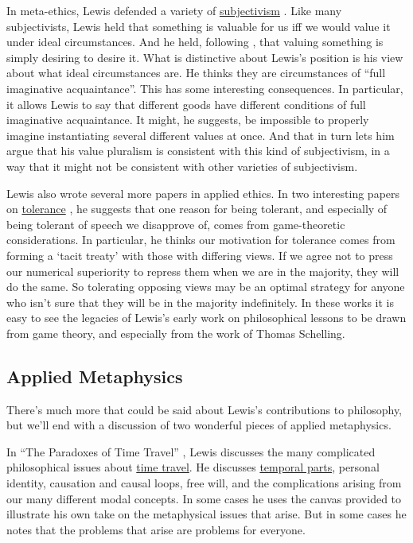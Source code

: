 In meta-ethics, Lewis defended a variety of \href{http://plato.stanford.edu/moral-anti-realism/index.html#Sub}{subjectivism} \citeyearpar{Lewis1989b}. Like many subjectivists, Lewis held that something is valuable for us iff we would value it under ideal circumstances. And he held, following \citet{Frankfurt1971}, that valuing something is simply desiring to desire it. What is distinctive about Lewis's position is his view about what ideal circumstances are. He thinks they are circumstances of ``full imaginative acquaintance''. This has some interesting consequences. In particular, it allows Lewis to say that different goods have different conditions of full imaginative acquaintance. It might, he suggests, be impossible to properly imagine instantiating several different values at once. And that in turn lets him argue that his value pluralism is consistent with this kind of subjectivism, in a way that it might not be consistent with other varieties of subjectivism.

Lewis also wrote several more papers in applied ethics. In two interesting papers on \href{http://plato.stanford.edu/toleration/}{tolerance} \citeyearpar{Lewis1989a, Lewis1989d}, he suggests that one reason for being tolerant, and especially of being tolerant of speech we disapprove of, comes from game-theoretic considerations. In particular, he thinks our motivation for tolerance comes from forming a `tacit treaty' with those with differing views. If we agree not to press our numerical superiority to repress them when we are in the majority, they will do the same. So tolerating opposing views may be an optimal strategy for anyone who isn't sure that they will be in the majority indefinitely. In these works it is easy to see the legacies of Lewis's early work on philosophical lessons to be drawn from game theory, and especially from the work of Thomas Schelling.

\subsection{Applied Metaphysics} 
There's much more that could be said about Lewis's contributions to philosophy, but we'll end with a discussion of two wonderful pieces of applied metaphysics.

In ``The Paradoxes of Time Travel'' \citeyearpar{Lewis1976d}, Lewis discusses the many complicated philosophical issues about \href{http://plato.stanford.edu/time-travel-phys/}{time travel}. He discusses \href{http://plato.stanford.edu/temporal-parts/}{temporal parts}, personal identity, causation and causal loops, free will, and the complications arising from our many different modal concepts. In some cases he uses the canvas provided to illustrate his own take on the metaphysical issues that arise. But in some cases he notes that the problems that arise are problems for everyone.


